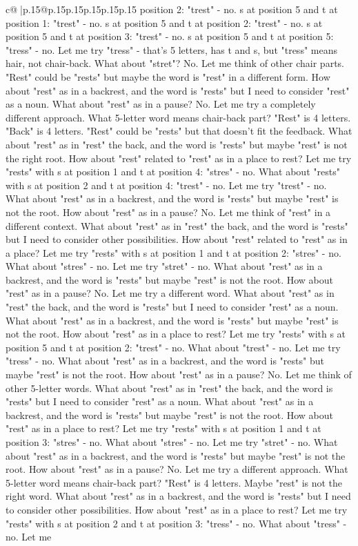 \documentclass{article}
\begin{document}
{\begin{supertabular}{c@{$\;$}|p{.15\linewidth}@{}p{.15\linewidth}p{.15\linewidth}p{.15\linewidth}p{.15\linewidth}p{.15\linewidth}}
{{{position 2: "trest" {-} no. s at position 5 and t at position 1: "trest" {-} no. s at position 5 and t at position 2: "trest" {-} no. s at position 5 and t at position 3: "trest" {-} no. s at position 5 and t at position 5: "tress" {-} no. Let me try "tress" {-} that's 5 letters, has t and s, but "tress" means hair, not chair{-}back. What about "stret"? No. Let me think of other chair parts. "Rest" could be "rests" but maybe the word is "rest" in a different form. How about "rest" as in a backrest, and the word is "rests" but I need to consider "rest" as a noun. What about "rest" as in a pause? No. Let me try a completely different approach. What 5{-}letter word means chair{-}back part? "Rest" is 4 letters. "Back" is 4 letters. "Rest" could be "rests" but that doesn't fit the feedback. What about "rest" as in "rest" the back, and the word is "rests" but maybe "rest" is not the right root. How about "rest" related to "rest" as in a place to rest? Let me try "rests" with s at position 1 and t at position 4: "stres" {-} no. What about "rests" with s at position 2 and t at position 4: "trest" {-} no. Let me try "trest" {-} no. What about "rest" as in a backrest, and the word is "rests" but maybe "rest" is not the root. How about "rest" as in a pause? No. Let me think of "rest" in a different context. What about "rest" as in "rest" the back, and the word is "rests" but I need to consider other possibilities. How about "rest" related to "rest" as in a place? Let me try "rests" with s at position 1 and t at position 2: "stres" {-} no. What about "stres" {-} no. Let me try "stret" {-} no. What about "rest" as in a backrest, and the word is "rests" but maybe "rest" is not the root. How about "rest" as in a pause? No. Let me try a different word. What about "rest" as in "rest" the back, and the word is "rests" but I need to consider "rest" as a noun. What about "rest" as in a backrest, and the word is "rests" but maybe "rest" is not the root. How about "rest" as in a place to rest? Let me try "rests" with s at position 5 and t at position 2: "trest" {-} no. What about "trest" {-} no. Let me try "tress" {-} no. What about "rest" as in a backrest, and the word is "rests" but maybe "rest" is not the root. How about "rest" as in a pause? No. Let me think of other 5{-}letter words. What about "rest" as in "rest" the back, and the word is "rests" but I need to consider "rest" as a noun. What about "rest" as in a backrest, and the word is "rests" but maybe "rest" is not the root. How about "rest" as in a place to rest? Let me try "rests" with s at position 1 and t at position 3: "stres" {-} no. What about "stres" {-} no. Let me try "stret" {-} no. What about "rest" as in a backrest, and the word is "rests" but maybe "rest" is not the root. How about "rest" as in a pause? No. Let me try a different approach. What 5{-}letter word means chair{-}back part? "Rest" is 4 letters. Maybe "rest" is not the right word. What about "rest" as in a backrest, and the word is "rests" but I need to consider other possibilities. How about "rest" as in a place to rest? Let me try "rests" with s at position 2 and t at position 3: "tress" {-} no. What about "tress" {-} no. Let me }}}
\end{supertabular}}
\end{document}
